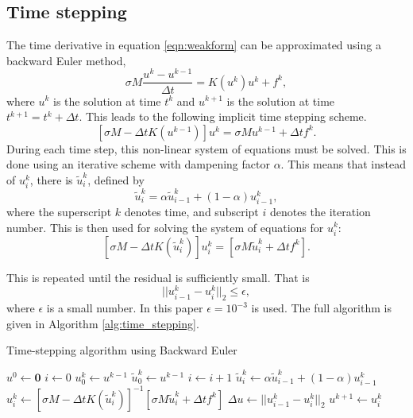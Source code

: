 \subsection{Time stepping}
The time derivative in equation \ref{eqn:weakform} can be approximated using a backward Euler method, 
\begin{equation*}
    \sigma M\frac{u^{k} - u^{k-1}}{\Delta t} = K(u^{k}) u^{k} + f^{k},
\end{equation*}
where $u^k$ is the solution at time $t^k$ and $u^{k+1}$ is the solution at time $t^{k+1} = t^k + \Delta t$.
This leads to the following implicit time stepping scheme.
\begin{equation*}
    \left[\sigma M - \Delta t K(u^{k-1})\right]u^{k} = \sigma M u^{k-1} + \Delta t f^{k}.
\end{equation*}
During each time step, this non-linear system of equations must be solved. This is done using an iterative scheme with dampening factor $\alpha$. This means that instead of $u^k_i$, there is $\tilde{u}^k_i$, defined by
\begin{equation*}
    \tilde{u}^k_{i} = \alpha \tilde{u}^k_{i-1} + (1-\alpha)u^k_{i-1},
\end{equation*}
where the superscript $k$ denotes time, and subscript $i$ denotes the iteration number. This is then used for solving the system of equations for $u^k_i$:
\begin{equation}
    \left[\sigma M - \Delta t K(\tilde{u}^k_{i})\right] u^k_{i} = \left[\sigma M \tilde{u}_{i}^{k} + \Delta t f^{k}\right].
\end{equation}

\noindent This is repeated until the residual is sufficiently small. That is
\begin{equation*}
    ||u^k_{i-1} - u^{k}_i||_2 \leq \epsilon,
\end{equation*}
where $\epsilon$ is a small number. In this paper $\epsilon = 10^{-3}$ is used. The full algorithm is given in Algorithm \ref{alg:time_stepping}.


\begin{algorithm}
    \caption{\label{alg:time_stepping} Time-stepping algorithm using Backward Euler}
    \begin{algorithmic}[1]
    \State $u^0 \leftarrow \textbf{0}$
        \State $i \leftarrow 0$
        \State $u^k_0 \leftarrow u^{k-1}$
        \State $\tilde{u}^k_0 \leftarrow u^{k-1}$
            \State $i \leftarrow i + 1$
            \State $\tilde{u}^k_{i} \leftarrow \alpha \tilde{u}^k_{i-1} + (1-\alpha)u^k_{i-1}$
            \State $u^k_{i} \leftarrow \left[\sigma M - \Delta t K(\tilde{u}^k_{i})\right]^{-1}\left[\sigma M \tilde{u}_{i}^{k} + \Delta t f^{k}\right]$
            \State $\Delta u \leftarrow ||u^k_{i-1} - u^{k}_i||_2$
        \EndWhile
        \State $u^{k+1} \leftarrow u^k_i$
    \EndFor
    \EndFunction
    \end{algorithmic}
\end{algorithm}